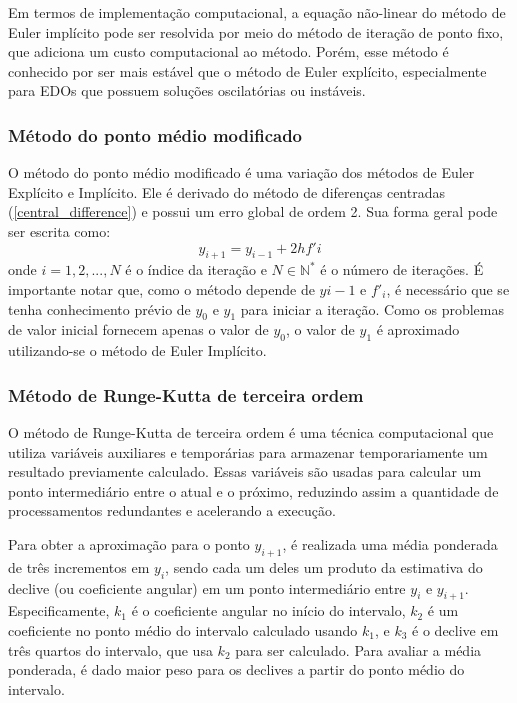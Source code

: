 Em termos de implementação computacional, a equação não-linear do método de Euler implícito pode ser resolvida por meio do método de iteração de ponto fixo, que adiciona um custo computacional ao método. Porém, esse método é conhecido por ser mais estável que o método de Euler explícito, especialmente para EDOs que possuem soluções oscilatórias ou instáveis.


\subsubsection{Método do ponto médio modificado}\label{sec:modified-midpoint} \quad

O método do ponto médio modificado é uma variação dos métodos de Euler Explícito e Implícito. Ele é derivado do método de diferenças centradas (\ref{central_difference}) e possui um erro global de ordem 2. Sua forma geral pode ser escrita como:
\begin{equation*}
y_{i+1} = y_{i-1} + 2 h f'i
\end{equation*}
onde $i = 1, 2,...,N$ é o índice da iteração e $N \in \mathbb{N}^*$ é o número de iterações. É importante notar que, como o método depende de $y{i-1}$ e $f'_i$, é necessário que se tenha conhecimento prévio de $y_0$ e $y_1$ para iniciar a iteração. Como os problemas de valor inicial fornecem apenas o valor de $y_0$, o valor de $y_1$ é aproximado utilizando-se o método de Euler Implícito.

\subsubsection{Método de Runge-Kutta de terceira ordem}\label{sec:3rd-order-runge-kutta} \quad

O método de Runge-Kutta de terceira ordem é uma técnica computacional que utiliza variáveis auxiliares e temporárias para armazenar temporariamente um resultado previamente calculado. Essas variáveis são usadas para calcular um ponto intermediário entre o atual e o próximo, reduzindo assim a quantidade de processamentos redundantes e acelerando a execução.

Para obter a aproximação para o ponto $y_{i+1}$, é realizada uma média ponderada de três incrementos em $y_i$, sendo cada um deles um produto da estimativa do declive (ou coeficiente angular) em um ponto intermediário entre $y_i$ e $y_{i+1}$. Especificamente, $k_1$ é o coeficiente angular no início do intervalo, $k_2$ é um coeficiente no ponto médio do intervalo calculado usando $k_1$, e $k_3$ é o declive em três quartos do intervalo, que usa $k_2$ para ser calculado. Para avaliar a média ponderada, é dado maior peso para os declives a partir do ponto médio do intervalo.

